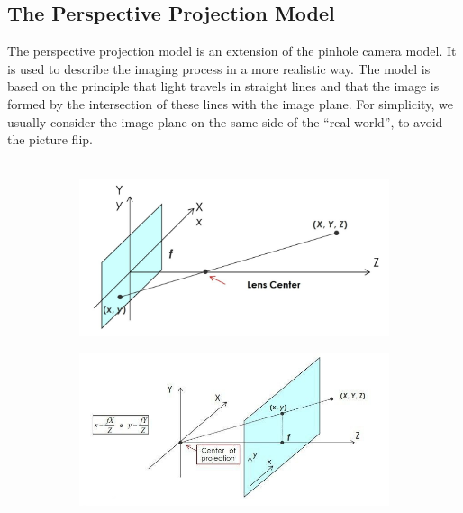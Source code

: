 \subsection{The Perspective Projection Model}
The perspective projection model is an extension of the pinhole camera model. It is used to describe the imaging process in a more realistic way. The model is based on the principle that light travels in straight lines and that the image is formed by the intersection of these lines with the image plane. 
For simplicity, we usually consider the image plane on the same side of the “real world”, to avoid the picture flip.\\\\
\begin{figure}[h]
    \begin{subfigure}{0.5\textwidth}
        \includegraphics[scale=0.2]{Figures/Perspective_proj1.jpeg} 
        \label{fig:subim1}
    \end{subfigure}
    \begin{subfigure}{0.5\textwidth}
        \includegraphics[scale=0.4]{Figures/Perspective_proj.jpeg}
        \label{fig:subim2}
    \end{subfigure}
        \label{fig:image2}
\end{figure}
